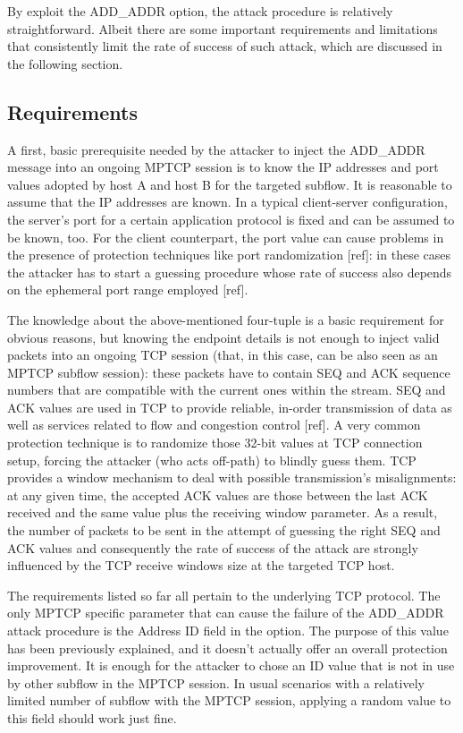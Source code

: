 By exploit the ADD\_ADDR option, the attack procedure is relatively straightforward. Albeit there are some important requirements and limitations that consistently limit the rate of success of such attack, which are discussed in the following section.

\subsection{Requirements}
A first, basic prerequisite needed by the attacker to inject the ADD\_ADDR message into an ongoing MPTCP session is to know the IP addresses and port values adopted by host A and host B for the targeted subflow. It is reasonable to assume that the IP addresses are known. In a typical client-server configuration, the server's port for a certain application protocol is fixed and can be assumed to be known, too. For the client counterpart, the port value can cause problems in the presence of protection techniques like port randomization [ref]: in these cases the attacker has to start a guessing procedure whose rate of success also depends on the ephemeral port range employed [ref].

The knowledge about the above-mentioned four-tuple is a basic requirement for obvious reasons, but knowing the endpoint details is not enough to inject valid packets into an ongoing TCP session (that, in this case, can be also seen as an MPTCP subflow session): these packets have to contain SEQ and ACK sequence numbers that are compatible with the current ones within the stream. SEQ and ACK values are used in TCP to provide reliable, in-order transmission of data as well as services related to flow and congestion control [ref]. A very common protection technique is to randomize those 32-bit values at TCP connection setup, forcing the attacker (who acts off-path) to blindly guess them. TCP provides a window mechanism to deal with possible transmission's misalignments: at any given time, the accepted ACK values are those between the last ACK received and the same value plus the receiving window parameter. As a result, the number of packets to be sent in the attempt of guessing the right SEQ and ACK values and consequently the rate of success of the attack are strongly influenced by the TCP receive windows size at the targeted TCP host.

The requirements listed so far all pertain to the underlying TCP protocol. The only MPTCP specific parameter that can cause the failure of the ADD\_ADDR attack procedure is the Address ID field in the option. The purpose of this value has been previously explained, and it doesn't actually offer an overall protection improvement. It is enough for the attacker to chose an ID value that is not in use by other subflow in the MPTCP session. In usual scenarios with a relatively limited number of subflow with the MPTCP session, applying a random value to this field should work just fine.

